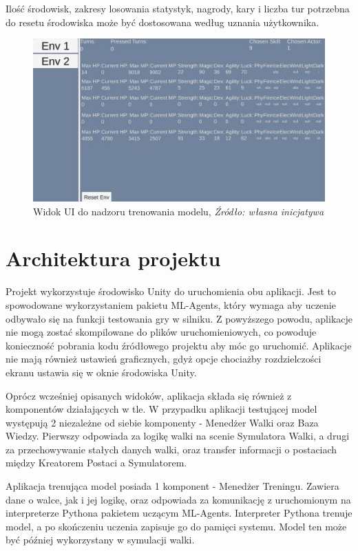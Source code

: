 \documentclass{SGGW-thesis}
\begin{document}
Ilość środowisk, zakresy losowania statystyk, nagrody, kary i liczba tur potrzebna do resetu środowiska może być dostosowana według uznania użytkownika.
\begin{figure}[H]
  \includegraphics[width=1\textwidth]{trainingui.JPG}
  \caption{Widok UI do nadzoru trenowania modelu, \textit{Źródło: własna inicjatywa}}
\end{figure}
\pagebreak
\section{Architektura projektu}
\label{architecture}
Projekt wykorzystuje środowisko Unity do uruchomienia obu aplikacji. 
Jest to spowodowane wykorzystaniem pakietu ML-Agents, który wymaga aby uczenie odbywało się na funkcji testowania gry w silniku.
Z powyższego powodu, aplikacje nie mogą zostać skompilowane do plików uruchomieniowych, co powoduje konieczność pobrania kodu źródłowego projektu aby móc go uruchomić.
Aplikacje nie mają również ustawień graficznych, gdyż opcje chociażby rozdzielczości ekranu ustawia się w oknie środowiska Unity.

Oprócz wcześniej opisanych widoków, aplikacja składa się również z komponentów działających w tle.
W przypadku aplikacji testującej model występują 2 niezależne od siebie komponenty - Menedżer Walki oraz Baza Wiedzy. 
Pierwszy odpowiada za logikę walki na scenie Symulatora Walki, a drugi za przechowywanie stałych danych walki, oraz transfer informacji o postaciach między Kreatorem Postaci a Symulatorem.

Aplikacja trenująca model posiada 1 komponent - Menedżer Treningu. Zawiera dane o walce, jak i jej logikę, oraz 
odpowiada za komunikację z uruchomionym na interpreterze Pythona pakietem uczącym ML-Agents. Interpreter Pythona trenuje model, a po skończeniu uczenia zapisuje go do pamięci systemu.
Model ten może być później wykorzystany w symulacji walki.
\end{document}
